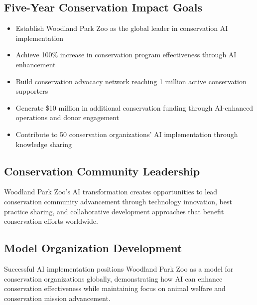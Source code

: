 \documentclass[
  Letterpaper,
]{scrbook}
\providecommand{\tightlist}{%
  \setlength{\itemsep}{0pt}\setlength{\parskip}{0pt}}
\begin{document}

\subsection*{Five-Year Conservation Impact
Goals}\label{five-year-conservation-impact-goals}

\begin{itemize}
\tightlist
\item
  Establish Woodland Park Zoo as the global leader in conservation AI
  implementation
\item
  Achieve 100\% increase in conservation program effectiveness through
  AI enhancement
\item
  Build conservation advocacy network reaching 1 million active
  conservation supporters
\item
  Generate \$10 million in additional conservation funding through
  AI-enhanced operations and donor engagement
\item
  Contribute to 50 conservation organizations' AI implementation through
  knowledge sharing
\end{itemize}

\subsection*{Conservation Community
Leadership}\label{conservation-community-leadership}

Woodland Park Zoo's AI transformation creates opportunities to lead
conservation community advancement through technology innovation, best
practice sharing, and collaborative development approaches that benefit
conservation efforts worldwide.

\subsection*{Model Organization
Development}\label{model-organization-development}

Successful AI implementation positions Woodland Park Zoo as a model for
conservation organizations globally, demonstrating how AI can enhance
conservation effectiveness while maintaining focus on animal welfare and
conservation mission advancement.
\end{document}
